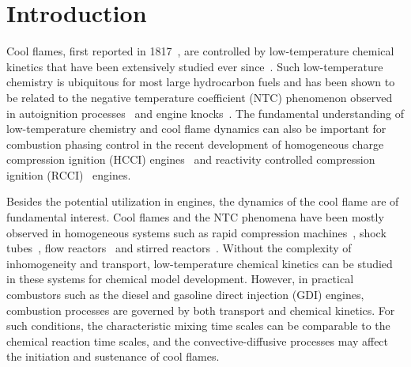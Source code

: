 \documentclass[review,3p,times]{elsarticle}
\begin{document}

\section{Introduction}

Cool flames, first reported in 1817~\cite{davy17}, are controlled by low-temperature chemical kinetics that have been extensively studied ever since~\cite{griffiths87}.  \textcolor{Rev1}{Such low-temperature chemistry is ubiquitous for most large hydrocarbon fuels and has been shown to be related to the negative temperature coefficient (NTC) phenomenon observed in autoignition processes~\cite{leppard90,ciezki93} and engine knocks~\cite{griffiths02}.  The fundamental understanding of low-temperature chemistry and cool flame dynamics can also be important for combustion phasing control in the recent development of homogeneous charge compression ignition (HCCI) engines~\cite{kong01,lu11} and reactivity controlled compression ignition (RCCI)~\cite{kokjohn11} engines.}

\textcolor{Rev1}{Besides the potential utilization in engines, the dynamics of the cool flame are of fundamental interest.  Cool flames and the NTC phenomena have been mostly observed in homogeneous systems such as rapid compression machines~\cite{griffiths02b,silke05,di14}, shock tubes~\cite{ciezki93,vasu08,herzler05}, flow reactors~\cite{koert94,curran00} and stirred reactors~\cite{dagaut95,kikui15}.}  Without the complexity of inhomogeneity and transport, low-temperature chemical kinetics can be studied in these systems for chemical model development.  However, in practical combustors such as the diesel and gasoline direct injection (GDI) engines, combustion processes are governed by both transport and chemical kinetics.  For such conditions, the characteristic mixing time scales can be comparable to the chemical reaction time scales, and the convective-diffusive processes may affect the initiation and sustenance of cool flames.
\end{document}
